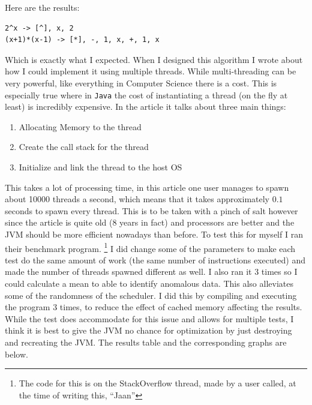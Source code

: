 \documentclass[../../../../../main.tex]{subfiles}
\begin{document}
Here are the results:
\begin{verbatim}
2^x -> [^], x, 2
(x+1)*(x-1) -> [*], -, 1, x, +, 1, x
\end{verbatim}
Which is exactly what I expected.
\newpage \noindent
When I designed this algorithm I wrote about how I could implement it using multiple threads. While multi-threading can be very powerful, like everything in Computer Science there is a cost. This is especially true where in \texttt{Java} the cost of instantiating a thread\cite{threadCreationJava} (on the fly at least) is incredibly expensive. In the article it talks about three main things:
\begin{enumerate}
\item Allocating Memory to the thread
\item Create the call stack for the thread\cite{threadStackJava, callStack}
\item Initialize and link the thread to the host OS
\end{enumerate}
This takes a lot of processing time, in this article\cite{threadCreationRate} one user manages to spawn about 10000 threads a second, which means that it takes approximately $0.1$ seconds to spawn every thread. This is to be taken with a pinch of salt however since the article is quite old (8 years in fact) and processors are better and the JVM should be more efficient nowadays than before. To test this for myself I ran their benchmark program.
\footnote{The code for this is on the StackOverflow thread, made by a user called, at the time of writing this, ``Jaan''\cite{threadCreationRate}} 
I did change some of the parameters to make each test do the same amount of work (the same number of instructions executed) and made the number of threads spawned different as well. I also ran it 3 times so I could calculate a mean to able to identify anomalous data. This also alleviates some of the randomness of the scheduler. I did this by compiling and executing the program 3 times, to reduce the effect of cached memory affecting the results. While the test does accommodate for this issue and allows for multiple tests, I think it is best to give the JVM no chance for optimization by just destroying and recreating the JVM. The results table and the corresponding graphs are below.
\end{document}
